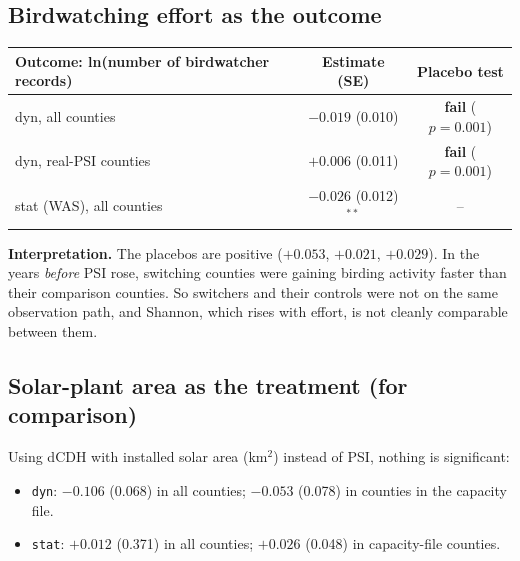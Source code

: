 \documentclass[11pt]{article}
\begin{document}
\subsection{Birdwatching effort as the outcome}
\begin{center}\small
\begin{tabular}{lcc}
\toprule
Outcome: ln(number of birdwatcher records) & Estimate (SE) & Placebo test \\
\midrule
dyn, all counties & $-0.019$ (0.010) & \textbf{fail} ($p=0.001$) \\
dyn, real-PSI counties & $+0.006$ (0.011) & \textbf{fail} ($p=0.001$) \\
stat (WAS), all counties & $-0.026$ (0.012)$^{**}$ & -- \\
\bottomrule
\end{tabular}
\end{center}
\textbf{Interpretation.} The placebos are positive ($+0.053$, $+0.021$, $+0.029$). In the years \emph{before} PSI rose, switching counties were gaining birding activity faster than their comparison counties. So switchers and their controls were not on the same observation path, and Shannon, which rises with effort, is not cleanly comparable between them.

\subsection{Solar-plant area as the treatment (for comparison)}
Using dCDH with installed solar area (km$^2$) instead of PSI, nothing is significant:
\begin{itemize}[leftmargin=14pt,itemsep=1pt]
\item \texttt{dyn}: $-0.106$ (0.068) in all counties; $-0.053$ (0.078) in counties in the capacity file.
\item \texttt{stat}: $+0.012$ (0.371) in all counties; $+0.026$ (0.048) in capacity-file counties.
\end{itemize}
\end{document}
